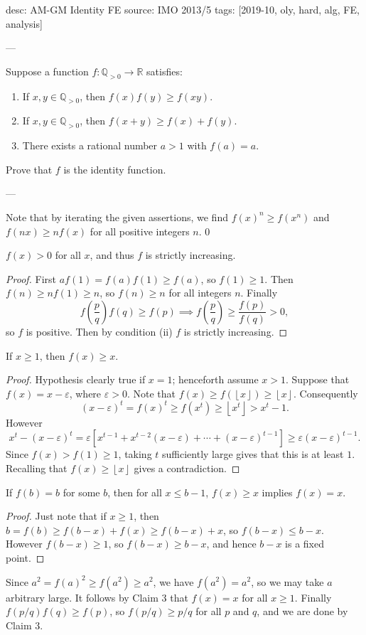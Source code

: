 desc: AM-GM Identity FE
source: IMO 2013/5
tags: [2019-10, oly, hard, alg, FE, analysis]

---

Suppose a function $f:\mathbb Q_{>0}\to\mathbb R$ satisfies:
\begin{enumerate}[label=(\roman*),itemsep=0em]
    \item If $x,y\in\mathbb Q_{>0}$, then $f(x)f(y)\ge f(xy)$.
    \item If $x,y\in\mathbb Q_{>0}$, then $f(x+y)\ge f(x)+f(y)$.
    \item There exists a rational number $a>1$ with $f(a)=a$.
\end{enumerate}
Prove that $f$ is the identity function.

---

Note that by iterating the given assertions, we find $f(x)^n\ge f(x^n)$ and $f(nx)\ge nf(x)$ for all positive integers $n$.
\setcounter{claim}0
\begin{claim}
    $f(x)>0$ for all $x$, and thus $f$ is strictly increasing. 
\end{claim}
\begin{proof}
    First $af(1)=f(a)f(1)\ge f(a)$, so $f(1)\ge1$. Then $f(n)\ge nf(1)\ge n$, so $f(n)\ge n$ for all integers $n$. Finally \[f\left(\frac pq\right)f(q)\ge f(p)\implies f\left(\frac pq\right)\ge\frac{f(p)}{f(q)}>0,\]
    so $f$ is positive. Then by condition (ii) $f$ is strictly increasing.
\end{proof}
\begin{claim}
    If $x\ge1$, then $f(x)\ge x$.
\end{claim}
\begin{proof}
    Hypothesis clearly true if $x=1$; henceforth assume $x>1$. Suppose that $f(x)=x-\varepsilon$, where $\varepsilon>0$. Note that $f(x)\ge f(\left\lfloor x\right\rfloor)\ge\left\lfloor x\right\rfloor$. Consequently \[(x-\varepsilon)^t=f(x)^t\ge f(x^t)\ge\left\lfloor x^t\right\rfloor>x^t-1.\]
    However \[x^t-(x-\varepsilon)^t=\varepsilon\left[x^{t-1}+x^{t-2}(x-\varepsilon)+\cdots+(x-\varepsilon)^{t-1}\right]\ge\varepsilon(x-\varepsilon)^{t-1}.\]
    Since $f(x)>f(1)\ge1$, taking $t$ sufficiently large gives that this is at least $1$. Recalling that $f(x)\ge\left\lfloor x\right\rfloor$ gives a contradiction.
\end{proof}
\begin{claim}
    If $f(b)=b$ for some $b$, then for all $x\le b-1$, $f(x)\ge x$ implies $f(x)=x$.
\end{claim}
\begin{proof}
    Just note that if $x\ge1$, then $b=f(b)\ge f(b-x)+f(x)\ge f(b-x)+x$, so $f(b-x)\le b-x$. However $f(b-x)\ge1$, so $f(b-x)\ge b-x$, and hence $b-x$ is a fixed point.
\end{proof}

Since $a^2=f(a)^2\ge f(a^2)\ge a^2$, we have $f(a^2)=a^2$, so we may take $a$ arbitrary large. It follows by Claim 3 that $f(x)=x$ for all $x\ge1$. Finally $f(p/q)f(q)\ge f(p)$, so $f(p/q)\ge p/q$ for all $p$ and $q$, and we are done by Claim 3.
